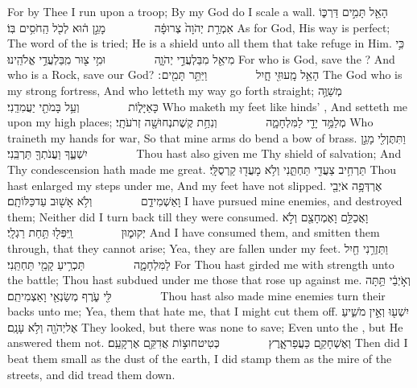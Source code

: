 {For by Thee I run upon a troop; By my God do I scale a wall.}
{הָאֵ֖ל תָּמִ֣ים דַּרְכּ֑וֹ אִמְרַ֤ת יְהֹוָה֙ צְרוּפָ֔ה         מָגֵ֣ן ה֔וּא לְכֹ֖ל הַֽחֹסִ֥ים בּֽוֹ׃}
{As for God, His way is perfect; The word of the \lord\space is tried; He is a shield unto all them that take refuge in Him.}
{כִּ֥י מִי\maqqaf אֵ֖ל מִבַּלְעֲדֵ֣י יְהֹוָ֑ה         וּמִ֥י צ֖וּר מִֽבַּלְעֲדֵ֥י אֱלֹהֵֽינוּ׃}
{For who is God, save the \lord? And who is a Rock, save our God?}
{הָאֵ֥ל מָֽעוּזִּ֖י חָ֑יִל         וַיַּתֵּ֥ר תָּמִ֖ים ׃}
{The God who is my strong fortress, And who letteth my way go forth straight;}
{מְשַׁוֶּ֥ה  כָּאַיָּל֑וֹת         וְעַ֥ל בָּמֹתַ֖י יַעֲמִדֵֽנִי׃}
{Who maketh my feet like hinds’ , And setteth me upon my high places;}
{מְלַמֵּ֥ד יָדַ֖י לַמִּלְחָמָ֑ה         וְנִחַ֥ת קֶשֶׁת\maqqaf נְחוּשָׁ֖ה זְרֹעֹתָֽי׃}
{Who traineth my hands for war, So that mine arms do bend a bow of brass.}
{וַתִּתֶּן\maqqaf לִ֖י מָגֵ֣ן יִשְׁעֶ֑ךָ וַעֲנֹתְךָ֖ תַּרְבֵּֽנִי׃        }
{Thou hast also given me Thy shield of salvation; And Thy condescension hath made me great.}
{תַּרְחִ֥יב צַעֲדִ֖י תַּחְתֵּ֑נִי וְלֹ֥א מָעֲד֖וּ קַרְסֻלָּֽי׃}
{Thou hast enlarged my steps under me, And my feet have not slipped.}
{אֶרְדְּפָ֥ה אֹיְבַ֖י וָאַשְׁמִידֵ֑ם         וְלֹ֥א אָשׁ֖וּב עַד\maqqaf כַּלּוֹתָֽם׃}
{I have pursued mine enemies, and destroyed them; Neither did I turn back till they were consumed.}
{וָאֲכַלֵּ֥ם וָאֶמְחָצֵ֖ם וְלֹ֣א יְקוּמ֑וּן         וַֽיִּפְּל֖וּ תַּ֥חַת רַגְלָֽי׃}
{And I have consumed them, and smitten them through, that they cannot arise; Yea, they are fallen under my feet.}
{וַתַּזְרֵ֥נִי חַ֖יִל לַמִּלְחָמָ֑ה         תַּכְרִ֥יעַ קָמַ֖י תַּחְתֵּֽנִי׃}
{For Thou hast girded me with strength unto the battle; Thou hast subdued under me those that rose up against me.}
{וְאֹ֣יְבַ֔י תַּ֥תָּה לִּ֖י עֹ֑רֶף מְשַׂנְאַ֖י וָאַצְמִיתֵֽם׃        }
{Thou hast also made mine enemies turn their backs unto me; Yea, them that hate me, that I might cut them off.}
{יִשְׁע֖וּ וְאֵ֣ין מֹשִׁ֑יעַ אֶל\maqqaf יְהֹוָ֖ה וְלֹ֥א עָנָֽם׃}
{They looked, but there was none to save; Even unto the \lord, but He answered them not.}
{וְאֶשְׁחָקֵ֖ם כַּעֲפַר\maqqaf אָ֑רֶץ         כְּטִיט\maqqaf חוּצ֥וֹת אֲדִקֵּ֖ם אֶרְקָעֵֽם׃}
{Then did I beat them small as the dust of the earth, I did stamp them as the mire of the streets, and did tread them down.}
